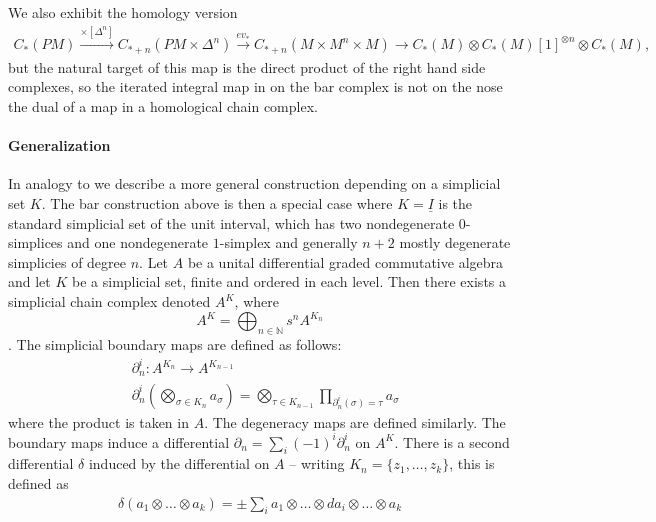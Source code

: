 \documentclass{scrartcl}
\theoremstyle{plain}
\theoremstyle{definition}
\newcommand{\N}{\mathbb N}
\let\xto\xrightarrow
\begin{document}
We also exhibit the homology version
\begin{align*}
    C_*(PM) \xto{\times [\Delta^n]} C_{*+n}(PM\times \Delta^n) \xto{ev_*} C_{*+n}(M\times M^n\times M)\to C_*(M)\otimes C_{*}(M)[1]^{\otimes n}\otimes C_*(M),
\end{align*}
but the natural target of this map is the direct product of the right hand side complexes, so the iterated integral map in on the bar complex is not on the nose the dual of a map in a homological chain complex.

\paragraph{Generalization}
In analogy to \cite[2.1]{patras2003cochain} we describe a more general construction depending on a simplicial set $K$. The bar construction above is then a special case where $K = \underline I$ is the standard simplicial set of the unit interval, which has two nondegenerate $0$-simplices and one nondegenerate $1$-simplex and generally $n+2$ mostly degenerate simplicies of degree $n$. Let $A$ be a unital differential graded commutative algebra and let $K$ be a simplicial set, finite and ordered in each level. Then there exists a simplicial chain complex denoted $A^{K}$, where $$A^{K} = \bigoplus_{n\in\N} s^n A^{K_n}$$. The simplicial boundary maps are defined as follows: 
\begin{align*}
    &\partial_n^i\colon A^{K_n} \to A^{K_{n-1}}\\
    &\partial^i_n\left(\bigotimes_{\sigma\in K_n} a_\sigma\right) = \bigotimes_{\tau\in K_{n-1}} \prod_{\partial^i_n(\sigma) = \tau} a_\sigma
\end{align*}
where the product is taken in $A$. The degeneracy maps are defined similarly. The boundary maps induce a differential $\partial_n = \sum_i (-1)^i\partial_n^i$ on $A^{K}$. There is a second differential $\delta$ induced by the differential on $A$ -- writing $K_n = \{z_1, \dots, z_k\}$, this is defined as
\begin{align*}
    \delta(a_1\otimes\dots\otimes a_k) = \pm\sum_i a_1\otimes\dots\otimes da_i\otimes\dots\otimes a_k
\end{align*}
\end{document}
